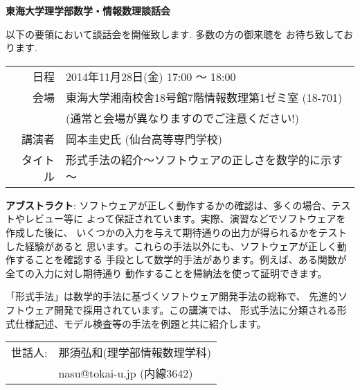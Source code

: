\documentclass[10pt]{jarticle}
\title{}
\author{}
\date{}
\theoremstyle{definition}
\begin{document}

\begin{center}
 {\bf \Huge 東海大学理学部数学・情報数理談話会}
\end{center}

{\Large
以下の要領において談話会を開催致します. 多数の方の御来聴を
お待ち致しております. 

\smallskip

\begin{center}
  \begin{tabular}{rl}
    日程 & 2014年11月28日(金) 17:00 〜 18:00 \\
    会場 & 東海大学湘南校舎18号館7階情報数理第1ゼミ室 (18-701)\\
    & (通常と会場が異なりますのでご注意ください!)\\
    講演者 & 岡本圭史氏 (仙台高等専門学校)\\
    タイトル & 形式手法の紹介～ソフトウェアの正しさを数学的に示す～
  \end{tabular}
\end{center}

\vskip 2cm

\noindent
{\bf アブストラクト}:\qquad
ソフトウェアが正しく動作するかの確認は、多くの場合、テストやレビュー等に
よって保証されています。実際、演習などでソフトウェアを作成した後に、
いくつかの入力を与えて期待通りの出力が得られるかをテストした経験があると
思います。これらの手法以外にも、ソフトウェアが正しく動作することを確認する
手段として数学的手法があります。例えば、ある関数が全ての入力に対し期待通り
動作することを帰納法を使って証明できます。

「形式手法」は数学的手法に基づくソフトウェア開発手法の総称で、
先進的ソフトウェア開発で採用されています。この講演では、
形式手法に分類される形式仕様記述、モデル検査等の手法を例題と共に紹介します。

\vskip 2cm

\begin{flushright}
  \begin{tabular}{rl}
      世話人: & 那須弘和(理学部情報数理学科)\\
      & nasu@tokai-u.jp (内線3642)
  \end{tabular}

\end{flushright}
}
\end{document}
